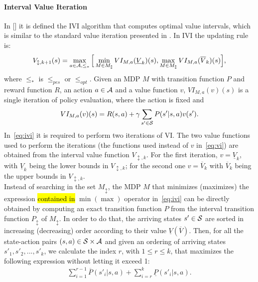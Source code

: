 \paragraph{Interval Value Iteration}
In [\cite{givan2000bounded}] it is defined the \acf{IVI} algorithm that computes optimal value intervals, which is similar to the standard value iteration presented in . In \ac{IVI} the updating rule is:
\begin{align}
V_{\updownarrow, k+1}(s) = \max_{a \in \mathcal{A}, \leq_{*}} \Big[ \min_{M \in M_{\updownarrow}} VI_{M, a}(\underline{V}_{k})(s), \max_{M \in M_{\updownarrow}} VI_{M, a}(\overline{V}_{k})(s) \Big], \label{eq:ivi}
\end{align}
where $\leq_{*}$ is $\leq_{pes}$ or $\leq_{opt}$. Given an \ac{MDP} $M$ with transition function $P$ and reward function $R$, an action $a \in \mathcal{A}$ and a value function $v$, $VI_{M, a}(v)(s)$ is a single iteration of policy evaluation, where the action is fixed and 
\begin{align} 
VI_{M, a}(v)(s) = R(s,a) + \gamma \sum_{s' \in \mathcal{S}} P(s'|s,a)v(s'). \label{eq:vi}
\end{align}
In~\eqref{eq:ivi} it is required to perform two iterations of VI. The two value functions used to perform the iterations (\ie the functions used instead of $v$ in~\eqref{eq:vi}) are obtained from the interval value function $V_{\updownarrow, k}$. For the first iteration, $v = \underline{V}_{k}$, with $\underline{V}_{k}$ being the lower bounds in $V_{\updownarrow, k}$; for the second one $v = \overline{V}_{k}$ with $\overline{V}_{k}$ being the upper bounds in $V_{\updownarrow, k}$.\\
\newline
Instead of searching in the set $M_{\updownarrow}$, the \ac{MDP} $M$ that minimizes (maximizes) the expression \hl{contained in} $\min (\max)$ operator in~\eqref{eq:ivi} can be directly obtained by computing an exact transition function $P$ from the interval transition function $P_{\updownarrow}$ of $M_{\updownarrow}$. In order to do that, the arriving states $s' \in \mathcal{S}$ are sorted in increasing (decreasing) order according to their value $\underline{V}(\overline{V})$. Then, for all the state-action pairs $(s,a) \in \mathcal{S} \times \mathcal{A}$ and given an ordering of arriving states $s'_1, s'_2, ..., s'_k$, we calculate the index $r$, with $1 \leq r \leq k$, that maximizes the following expression without letting it exceed 1:
\begin{align} \sum_{i=1}^{r-1}\overline{P}(s'_i|s,a) + \sum_{i=r}^{k}\underline{P}(s'_i|s,a). \end{align}
